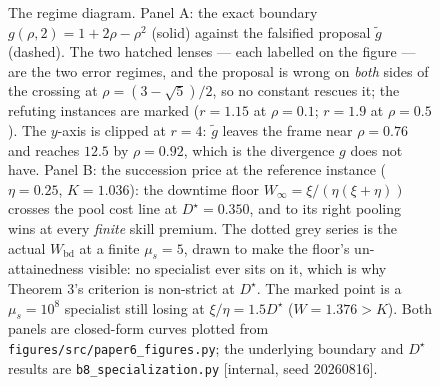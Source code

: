 \begin{figure}[t]
\begin{minipage}{0.48\textwidth}
\end{minipage}
\caption{The regime diagram. Panel A: the exact boundary $g(\rho,2)=1+2\rho-\rho^2$ (solid) against the falsified proposal
$\tilde g$ (dashed). The two hatched lenses --- each labelled on the figure --- are the two error regimes, and the proposal is
wrong on \emph{both} sides of the crossing at $\rho=(3-\sqrt5)/2$, so no constant rescues it; the refuting instances are marked
($r{=}1.15$ at $\rho{=}0.1$; $r{=}1.9$ at $\rho{=}0.5$). The $y$-axis is clipped at $r{=}4$: $\tilde g$ leaves the frame near
$\rho{=}0.76$ and reaches $12.5$ by $\rho{=}0.92$, which is the divergence $g$ does not have. Panel B:
the succession price at the reference instance ($\eta{=}0.25$, $K{=}1.036$): the downtime floor $W_\infty=\xi/(\eta(\xi+\eta))$
crosses the pool cost line at $D^\star=0.350$, and to its right pooling wins at every \emph{finite} skill premium. The dotted
grey series is the actual $W_{\mathrm{bd}}$ at a finite $\mu_s{=}5$, drawn to make the floor's un-attainedness visible: no
specialist ever sits on it, which is why Theorem 3's criterion is non-strict at $D^\star$. The marked point is a
$\mu_s=10^8$ specialist still losing at $\xi/\eta=1.5D^\star$ ($W=1.376>K$). Both panels are closed-form curves plotted from
\texttt{figures/src/paper6\_figures.py}; the underlying boundary and $D^\star$ results are \texttt{b8\_specialization.py}
[internal, seed 20260816].}
\label{fig:regime}
\end{figure}
